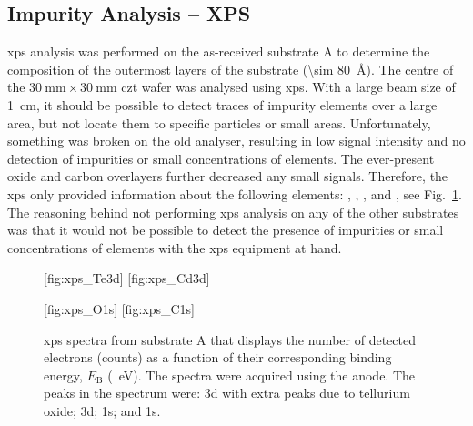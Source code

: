 
\subsection{Impurity Analysis -- XPS}

\Ac{xps} analysis was performed on the as-received substrate A to determine the composition of the outermost layers of the substrate (\SI{\sim 80}{\angstrom}). The centre of the $\SI{30}{\milli\metre}\times\SI{30}{\milli\metre}$ \ac{czt} wafer was analysed using \ac{xps}. With a large beam size of \SI{1}{\centi\metre}, it should be possible to detect traces of impurity elements over a large area, but not locate them to specific particles or small areas. Unfortunately, something was broken on the old analyser, resulting in low signal intensity and no detection of impurities or small concentrations of elements. The ever-present oxide and carbon overlayers further decreased any small signals. Therefore, the \ac{xps} only provided information about the following elements: , , , and , see Fig.~\ref{fig:xps_spectra}. The reasoning behind not performing \ac{xps} analysis on any of the other substrates was that it would not be possible to detect the presence of impurities or small concentrations of elements with the \ac{xps} equipment at hand.

\begin{figure}[htbp]
    \centering
    [fig:xps_Te3d]
    \hfill
    [fig:xps_Cd3d]
    \par\bigskip
    [fig:xps_O1s]
    \hfill
    [fig:xps_C1s]
    \caption[\Ac{xps} spectra from substrate A.]{\Ac{xps} spectra from substrate A that displays the number of detected electrons (counts) as a function of their corresponding binding energy, $E_\mathrm{B}$ (\SI{}{\electronvolt}). The spectra were acquired using the  anode. The peaks in the spectrum were:   3d with extra peaks due to tellurium oxide;   3d;   1s; and   1s.}
    \label{fig:xps_spectra}
\end{figure}
 
